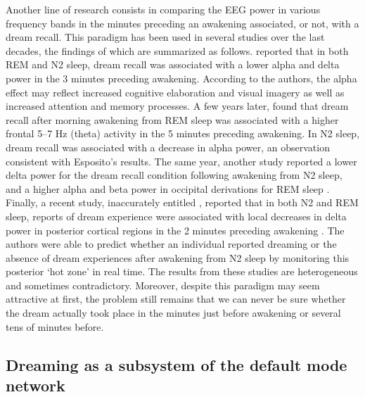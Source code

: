 Another line of research consists in comparing the EEG power in various frequency bands in the minutes preceding an awakening associated, or not, with a dream recall. This paradigm has been used in several studies over the last decades, the findings of which are summarized as follows. \citet{esposito_reduced_2004} reported that in both REM and N2 sleep, dream recall was associated with a lower alpha and delta power in the 3 minutes preceding awakening. According to the authors, the alpha effect may reflect increased cognitive elaboration and visual imagery as well as increased attention and memory processes. A few years later, \citet{marzano_recalling_2011} found that dream recall after morning awakening from REM sleep was associated with a higher frontal 5–7 Hz (theta) activity in the 5 minutes preceding awakening. In N2 sleep, dream recall was associated with a decrease in alpha power, an observation consistent with Esposito’s results. The same year, another study reported a lower delta power for the dream recall condition following awakening from N2 sleep, and a higher alpha and beta power in occipital derivations for REM sleep \citep{chellappa_cortical_2011}. Finally, a recent study, inaccurately entitled , reported that in both N2 and REM sleep, reports of dream experience were associated with local decreases in delta power in posterior cortical regions in the 2 minutes preceding awakening \citep{siclari_neural_2017}. The authors were able to predict whether an individual reported dreaming or the absence of dream experiences after awakening from N2 sleep by monitoring this posterior ‘hot zone’ in real time. The results from these studies are heterogeneous and sometimes contradictory. Moreover, despite this paradigm may seem attractive at first, the problem still remains that we can never be sure whether the dream actually took place in the minutes just before awakening or several tens of minutes before.

\subsection{Dreaming as a subsystem of the default mode network}
\label{sec:dream-research:attempts:dmn}

